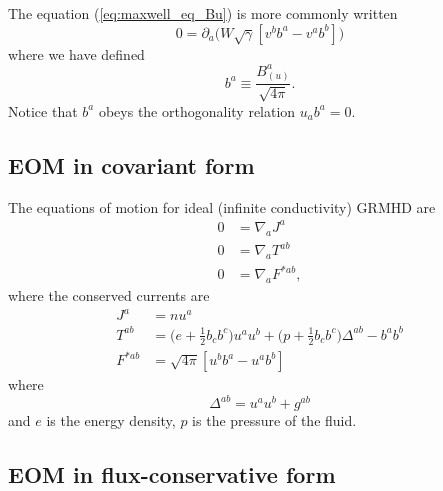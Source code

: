 \documentclass[12pt]{article}
\numberwithin{equation}{section}
\begin{document}
The equation (\ref{eq:maxwell_eq_Bu}) is more commonly written
\begin{equation}
0 = \partial_{a} \Big( W \sqrt{\gamma} [v^b b^{a} - v^a b^{b}] \Big)
\end{equation}
where we have defined
\begin{equation} \label{eq:ba}
b^{a} \equiv \frac{B^{a}_{(u)}}{\sqrt{4 \pi}}.
\end{equation}
Notice that $b^a$ obeys the orthogonality relation $u_a b^a = 0$.

\subsection{EOM in covariant form}

The equations of motion for ideal (infinite conductivity) GRMHD are
\begin{align}
0 &= \nabla_{a} J^{a}    \\
0 &= \nabla_{a} T^{ab}   \\
0 &= \nabla_{a} F^{*ab},
\end{align}
where the conserved currents are
\begin{align}
J^{a} &= n u^a \\
T^{ab} &= \Big( e + \frac{1}{2} b_c b^c \Big) u^a u^b + \Big( p + \frac{1}{2} b_c b^c \Big) \Delta^{ab} - b^a b^b  \\
F^{*ab} &= \sqrt{4 \pi} [u^b b^{a} - u^a b^{b}]
\end{align}
where
\begin{equation}
\Delta^{ab} = u^a u^b + g^{ab}
\end{equation}
and $e$ is the energy density, $p$ is the pressure of the fluid.

\subsection{EOM in flux-conservative form}
\end{document}
